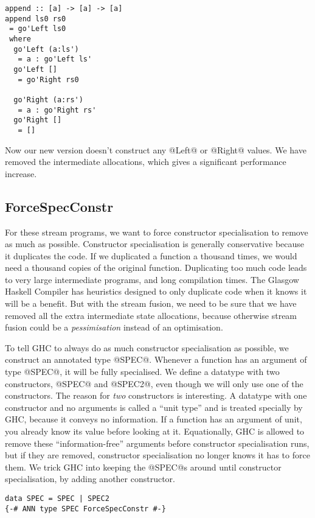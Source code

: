 \begin{lstlisting}
append :: [a] -> [a] -> [a]
append ls0 rs0
 = go'Left ls0
 where
  go'Left (a:ls')
   = a : go'Left ls'
  go'Left []
   = go'Right rs0

  go'Right (a:rs')
   = a : go'Right rs'
  go'Right []
   = []
\end{lstlisting}

Now our new version doesn't construct any @Left@ or @Right@ values.
We have removed the intermediate allocations, which gives a significant performance increase.

\subsection{ForceSpecConstr}
For these stream programs, we want to force constructor specialisation to remove as much as possible.
Constructor specialisation is generally conservative because it duplicates the code.
If we duplicated a function a thousand times, we would need a thousand copies of the original function.
Duplicating too much code leads to very large intermediate programs, and long compilation times.
The Glasgow Haskell Compiler has heuristics designed to only duplicate code when it knows it will be a benefit.
But with the stream fusion, we need to be sure that we have removed all the extra intermediate state allocations, because otherwise stream fusion could be a \emph{pessimisation} instead of an optimisation.

To tell GHC to always do as much constructor specialisation as possible, we construct an annotated type @SPEC@. Whenever a function has an argument of type @SPEC@, it will be fully specialised.
We define a datatype with two constructors, @SPEC@ and @SPEC2@, even though we will only use one of the constructors.
The reason for \emph{two} constructors is interesting.
A datatype with one constructor and no arguments is called a ``unit type'' and is treated specially by GHC, because it conveys no information.
If a function has an argument of unit, you already know its value before looking at it.
Equationally, GHC is allowed to remove these ``information-free'' arguments before constructor specialisation runs, but if they are removed, constructor specialisation no longer knows it has to force them.
We trick GHC into keeping the @SPEC@s around until constructor specialisation, by adding another constructor.

\begin{lstlisting}
data SPEC = SPEC | SPEC2
{-# ANN type SPEC ForceSpecConstr #-}
\end{lstlisting}

